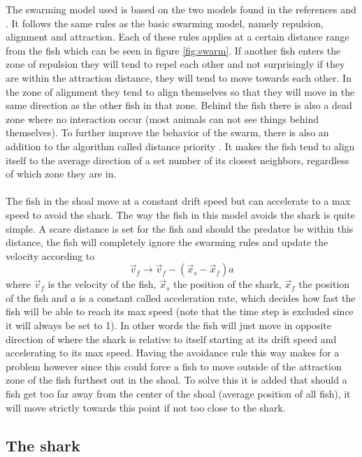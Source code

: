 The swarming model used is based on the two models found in the references
\cite{javafish} and \cite{matlabfish}. It follows the same rules as the basic
swarming model, namely repulsion, alignment and attraction. Each of these rules
applies at a certain distance range from the fish which can be seen in figure
\ref{fig:swarm}. If another fish enters the zone of repulsion they will tend to
repel each other and not surprisingly if they are within the attraction
distance, they will tend to move towards each other. In the zone of alignment
they tend to align themselves so that they will move in the same direction as
the other fish in that zone. Behind the fish there is also a dead zone where no
interaction occur (most animals can not see things behind themselves). To
further improve the behavior of the swarm, there is also an addition to the
algorithm called distance priority \cite{matlabfish}. It makes the fish tend to
align itself to the average direction of a set number of its closest neighbors,
regardless of which zone they are in.\\
\\
The fish in the shoal move at a constant drift speed but can accelerate to a max
speed to avoid the shark. The way the fish in this model avoids the shark is
quite simple. A scare distance is set for the fish and should the predator be
within this distance, the fish will completely ignore the swarming rules and
update the velocity according to
\begin{equation}
\vec{v}_f \rightarrow \vec{v}_f - (\vec{x}_s - \vec{x}_f)a
\end{equation}
where $\vec{v}_f$ is the velocity of the fish, $\vec{x}_s$ the position of the
shark, $\vec{x}_f$ the position of the fish and $a$ is a constant called
acceleration rate, which decides how fast the fish will be able to reach its max
speed (note that the time step is excluded since it will always be set to 1). In
other words the fish will just move in opposite direction of where the shark is
relative to itself starting at its drift speed and accelerating to its max
speed. Having the avoidance rule this way makes for a problem however since this
could force a fish to move outside of the attraction zone of the fish furthest
out in the shoal. To solve this it is added that should a fish get too far away
from the center of the shoal (average position of all fish), it will move
strictly towards this point if not too close to the shark.

\subsection{The shark}

